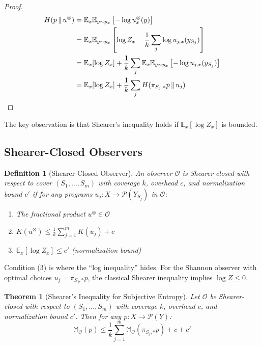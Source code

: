 \documentclass[11pt]{article}
\newtheorem{definition}{Definition}
\newtheorem{theorem}{Theorem}
\begin{document}
\begin{proof}
\begin{align}
H(p \,\|\, u^{\otimes}) &= \mathbb{E}_x \mathbb{E}_{y \sim p_x}\left[-\log u^{\otimes}_x(y)\right] \\
&= \mathbb{E}_x \mathbb{E}_{y \sim p_x}\left[\log Z_x - \frac{1}{k}\sum_j \log u_{j,x}(y_{S_j})\right] \\
&= \mathbb{E}_x[\log Z_x] + \frac{1}{k} \sum_j \mathbb{E}_x \mathbb{E}_{y \sim p_x}\left[-\log u_{j,x}(y_{S_j})\right] \\
&= \mathbb{E}_x[\log Z_x] + \frac{1}{k} \sum_j H(\pi_{S_j,*} p \,\|\, u_j) \qedhere
\end{align}
\end{proof}

The key observation is that Shearer's inequality holds if $\mathbb{E}_x[\log Z_x]$ is bounded.

\subsection*{Shearer-Closed Observers}

\begin{definition}[Shearer-Closed Observer]
An observer $\mathcal{O}$ is \emph{Shearer-closed} with respect to cover $(S_1, \ldots, S_m)$ with coverage $k$, overhead $c$, and normalization bound $c'$ if for any programs $u_j: X \to \mathcal{P}(Y_{S_j})$ in $\mathcal{O}$:
\begin{enumerate}
    \item The fractional product $u^{\otimes} \in \mathcal{O}$
    \item $K(u^{\otimes}) \leq \frac{1}{k} \sum_{j=1}^m K(u_j) + c$
    \item $\mathbb{E}_x[\log Z_x] \leq c'$ (normalization bound)
\end{enumerate}
\end{definition}

Condition (3) is where the ``log inequality'' hides. For the Shannon observer with optimal choices $u_j = \pi_{S_j,*}p$, the classical Shearer inequality implies $\log Z \leq 0$.

\begin{theorem}[Shearer's Inequality for Subjective Entropy]\label{thm:shearer}
Let $\mathcal{O}$ be Shearer-closed with respect to $(S_1, \ldots, S_m)$ with coverage $k$, overhead $c$, and normalization bound $c'$. Then for any $p: X \to \mathcal{P}(Y)$:
\[ \mathbb{M}_\mathcal{O}(p) \leq \frac{1}{k} \sum_{j=1}^m \mathbb{M}_\mathcal{O}(\pi_{S_j,*} p) + c + c' \]
\end{theorem}
\end{document}
